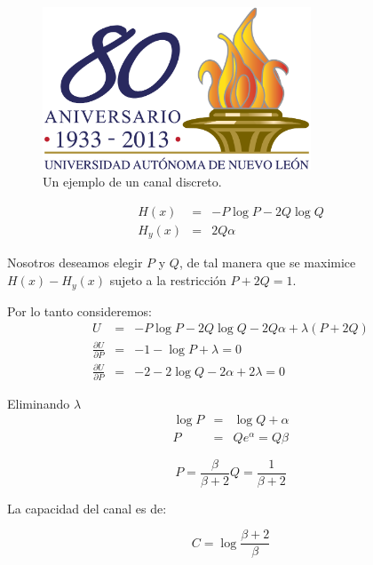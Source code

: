 \begin{figure}[!ht]
\centerline{\includegraphics[width=80mm]{ejemplo.png}}
\caption{Un ejemplo de un canal discreto.}
\label{fig:11}
\end{figure}

\begin{equation}
\begin{array}{rcl}
H(x) &=& -P\log{P} - 2Q\log{Q} \\
H_y(x) &=& 2Q\alpha
\end{array}
\end{equation}

Nosotros deseamos elegir $P$ y $Q$, de tal manera que se maximice
$H(x) - H_y(x)$ sujeto a la restricci\'on $P + 2Q = 1$.

Por lo tanto consideremos:
\begingroup
\renewcommand*{\arraystretch}{2.0}
\begin{equation}
\begin{array}{rcl}
U &=& -P\log{P} - 2Q\log{Q} -2Q\alpha + \lambda(P+2Q) \\
\displaystyle\frac{{\partial U}}{{\partial P}} &=& -1 - \log{P} + \lambda = 0 \\
\displaystyle\frac{{\partial U}}{{\partial P}} &=& -2 - 2\log{Q} -2\alpha + 2\lambda = 0
\end{array}
\end{equation}
\endgroup

Eliminando $\lambda$
\begin{equation}
\begin{array}{rcl}
\log{P} &=& \log{Q} + \alpha \\
P &=& Q e^\alpha = Q\beta 
\end{array}
\end{equation}

\begin{equation}
  P = \frac{\beta}{\beta + 2}   Q = \frac{1}{\beta + 2}
\end{equation}

La capacidad del canal es de:

\begin{equation}
  C = \log{\frac{\beta + 2}{\beta}}
\end{equation}

